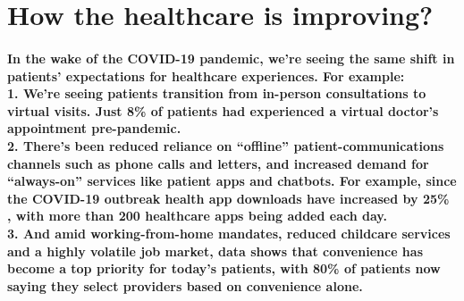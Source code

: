 \documentclass[12pt]{article}
\begin{document}
    
    \section{\textbf{How the healthcare is improving?}}
    \paragraph{ 
    	In the wake of the COVID-19 pandemic, we’re seeing the same shift in patients’ expectations for healthcare experiences. For example:
    	\\\textbf{1.} We’re seeing patients transition from in-person consultations to virtual visits. Just 8\% of patients had experienced a virtual doctor’s appointment pre-pandemic.
    	\\\textbf{2.} There’s been reduced reliance on “offline” patient-communications channels such as phone calls and letters, and increased demand for “always-on” services like patient apps and chatbots. For example, since the COVID-19 outbreak health app downloads have increased by 25\% , with more than 200 healthcare apps being added each day.
        \\\textbf{3.}	And amid working-from-home mandates, reduced childcare services and a highly volatile job market, data shows that convenience has become a top priority for today’s patients, with 80\% of patients now saying they select providers based on convenience alone.}
\end{document}
